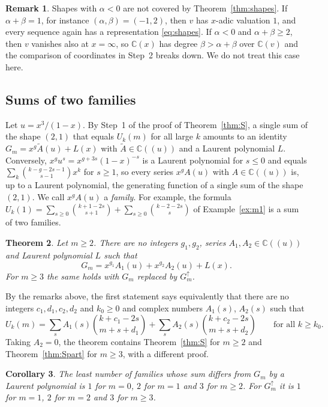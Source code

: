 \documentclass[11pt]{amsart}
\newtheorem{theorem}{Theorem}[section]
\newtheorem{corollary}[theorem]{Corollary}
\theoremstyle{definition}
\newtheorem{remark}[theorem]{Remark}
\newcommand{\C}{\mathbb{C}}
\begin{document}
\begin{remark}\label{rem:othershapes}
Shapes with $\alpha<0$ are not covered by Theorem~\ref{thm:shapes}. If $\alpha+\beta=1$, for instance $(\alpha,\beta)=(-1,2)$, then $v$ has $x$-adic valuation $1$, and every sequence again has a representation \eqref{eq:shapes}. If $\alpha<0$ and $\alpha+\beta\ge2$, then $v$ vanishes also at $x=\infty$, so $\C(x)$ has degree $\beta>\alpha+\beta$ over $\C(v)$ and the comparison of coordinates in Step~2 breaks down. We do not treat this case here.
\end{remark}

\subsection{Sums of two families}\label{sec:twofam}
Let $u=x^3/(1-x)$. By Step~1 of the proof of Theorem~\ref{thm:S}, a single sum of the shape $(2,1)$ that equals $U_k(m)$ for all large $k$ amounts to an identity $G_m=x^g\tilde A(u)+L(x)$ with $\tilde A\in\C((u))$ and a Laurent polynomial $L$. Conversely, $x^gu^s=x^{g+3s}(1-x)^{-s}$ is a Laurent polynomial for $s\le0$ and equals $\sum_k\binom{k-g-2s-1}{s-1}x^k$ for $s\ge1$, so every series $x^gA(u)$ with $A\in\C((u))$ is, up to a Laurent polynomial, the generating function of a single sum of the shape $(2,1)$. We call $x^gA(u)$ a \emph{family}. For example, the formula $U_k(1)=\sum_{s\ge0}\binom{k+1-2s}{s+1}+\sum_{s\ge0}\binom{k-2-2s}{s}$ of Example~\ref{ex:m1} is a sum of two families.

\begin{theorem}\label{thm:twofam}
Let $m\ge2$. There are no integers $g_1,g_2$, series $A_1,A_2\in\C((u))$ and Laurent polynomial $L$ such that
\[
  G_m=x^{g_1}A_1(u)+x^{g_2}A_2(u)+L(x).
\]
For $m\ge3$ the same holds with $G_m$ replaced by $G^{\uparrow}_m$.
\end{theorem}

By the remarks above, the first statement says equivalently that there are no integers $c_1,d_1,c_2,d_2$ and $k_0\ge0$ and complex numbers $A_1(s)$, $A_2(s)$ such that
\[
  U_k(m)=\sum_sA_1(s)\binom{k+c_1-2s}{m+s+d_1}+\sum_sA_2(s)\binom{k+c_2-2s}{m+s+d_2}\qquad\text{for all }k\ge k_0.
\]
 Taking $A_2=0$, the theorem contains Theorem~\ref{thm:S} for $m\ge2$ and Theorem~\ref{thm:Spart} for $m\ge3$, with a different proof.

\begin{corollary}\label{cor:families}
The least number of families whose sum differs from $G_m$ by a Laurent polynomial is $1$ for $m=0$, $2$ for $m=1$ and $3$ for $m\ge2$. For $G^{\uparrow}_m$ it is $1$ for $m=1$, $2$ for $m=2$ and $3$ for $m\ge3$.
\end{corollary}
\end{document}
